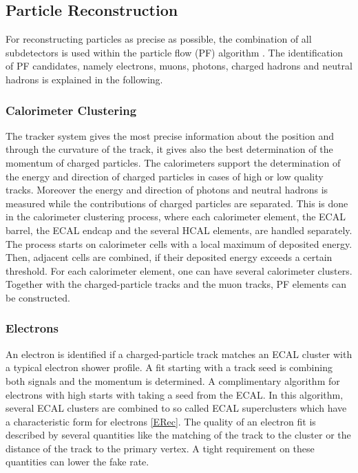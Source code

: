 \subsection{Particle Reconstruction}
For reconstructing particles as precise as possible, the combination of all subdetectors is used within the particle flow (PF) algorithm \cite{ParticleFlow, ParticleFlow2}. The identification of PF candidates, namely electrons, muons, photons, charged hadrons and neutral hadrons is explained in the following. 

\subsubsection*{Calorimeter Clustering}
The tracker system gives the most precise information about the position and through the curvature of the track, it gives also the best determination of the momentum of charged particles. The calorimeters support the determination of the energy and direction of charged particles in cases of high \pt or low quality tracks. Moreover the energy and direction of photons and neutral hadrons is measured while the contributions of charged particles are separated. This is done in the calorimeter clustering process, where each calorimeter element, the ECAL barrel, the ECAL endcap and the several HCAL elements, are handled separately. The process starts on calorimeter cells with a local maximum of deposited energy. Then, adjacent cells are combined, if their deposited energy exceeds a certain threshold. For each calorimeter element, one can have several calorimeter clusters. Together with the charged-particle tracks and the muon tracks, PF elements can be constructed.

\subsubsection*{Electrons}
An electron is identified if a charged-particle track matches an ECAL cluster with a typical electron shower profile. A fit starting with a track seed is combining both signals and the momentum is determined. A complimentary algorithm for electrons with high \pt starts with taking a seed from the ECAL. In this algorithm, several ECAL clusters are combined to so called ECAL superclusters which have a characteristic form for electrons \ref{ERec}. The quality of an electron fit is described by several quantities like the matching of the track to the cluster or the distance of the track to the primary vertex. A tight requirement on these quantities can lower the fake rate.


